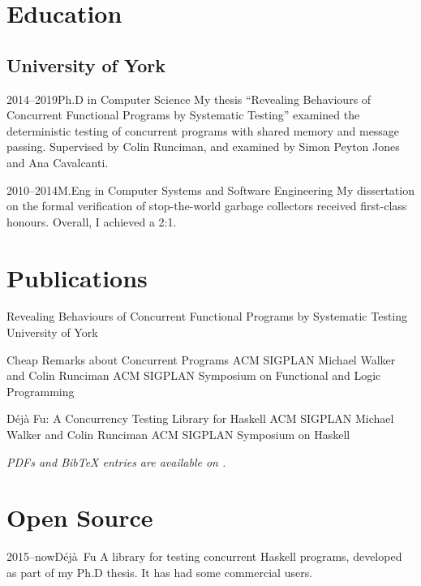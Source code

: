 \documentclass[a4paper]{barrucadu-cv}
\newcommand{\range}[2]{#1–#2}
\newcommand{\orange}[1]{\range{#1}{now}}
\begin{document}
\section{Education}

\subsection{University of York}

\begin{cventry}{\range{2014}{2019}}{Ph.D in Computer Science}
  My thesis ``Revealing Behaviours of Concurrent Functional Programs
  by Systematic Testing'' examined the deterministic testing of
  concurrent programs with shared memory and message passing.
  Supervised by Colin Runciman, and examined by Simon Peyton Jones and
  Ana Cavalcanti.
\end{cventry}

\begin{cventry}{\range{2010}{2014}}{M.Eng in Computer Systems and Software Engineering}
  My dissertation on the formal verification of stop-the-world garbage
  collectors received first-class honours.  Overall, I achieved a 2:1.
\end{cventry}

\section{Publications}

\def\entryheadinglevel{subsection}

  {Revealing Behaviours of Concurrent Functional Programs by Systematic Testing}
  {University of York}

  {Cheap Remarks about Concurrent Programs}
  {ACM SIGPLAN}
  {Michael Walker and Colin Runciman}
  {ACM SIGPLAN Symposium on Functional and Logic Programming}

  {Déjà Fu: A Concurrency Testing Library for Haskell}
  {ACM SIGPLAN}
  {Michael Walker and Colin Runciman}
  {ACM SIGPLAN Symposium on Haskell}

\textit{PDFs and BibTeX entries are available on .}

\section{Open Source}

\begin{cventry}{\orange{2015}}{D\'{e}j\`{a}~Fu}
  A library for testing concurrent Haskell programs,
  developed as part of my Ph.D thesis. It has had some commercial users.

  \textbf{\small{}}
\end{cventry}
\end{document}
